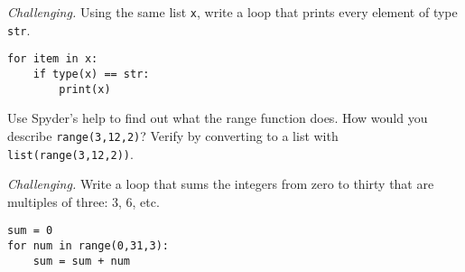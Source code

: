\documentclass[11pt]{exam}
\begin{document}
\begin{questions}
\item {\it Challenging.\/}
Using the same list {\tt x}, write a loop that prints every element of type {\tt str}.

\begin{solution}
\begin{verbatim}
for item in x:
    if type(x) == str:
        print(x)
\end{verbatim}
\end{solution}


\item Use Spyder's help to find out what the range function does.
How would you describe {\tt range(3,12,2)}?
Verify by converting to a list with {\tt list(range(3,12,2))}.

\item {\it Challenging.\/}
Write a loop that sums the integers from zero to thirty that are multiples of three:
3, 6, etc.

\begin{solution}
\begin{verbatim}
sum = 0
for num in range(0,31,3):
    sum = sum + num
\end{verbatim}
\end{solution}


\begin{comment}
\item Suppose the current price of corn is \$1.20.
The price is set to increase by 10 cents every weekday until it hits \$2.50.
(Nothing happens on weekends.)
At that point it will switch directions and decrease by 10 cents a day.
Finish the code below to print the price of corn every day until it reaches \$2.50.
\begin{verbatim}
days = ["M", "T", "W", "Th", "F"]
starting_price = 1.20
current_price = starting_price
while True:
for day in days:
    current_price = current_price + 0.10
    print("The price on ", day, "is ", current_price)
if current_price == 2.50:
    break
\end{verbatim}
\end{comment}





\end{questions}
\end{document}
